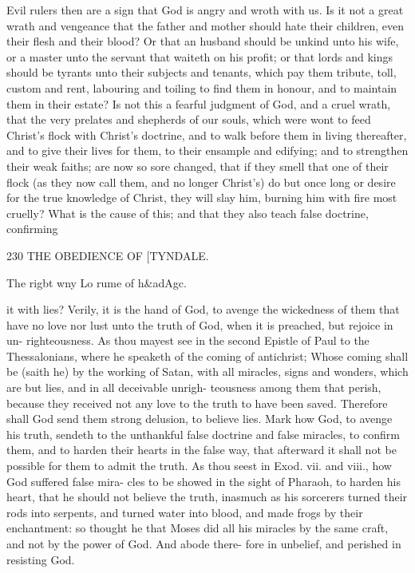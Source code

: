 \documentclass{custom}
\begin{document}
{Evil rulers then are a sign that God is angry and wroth
with us. Is it not a great wrath and vengeance that the
father and mother should hate their children, even their
flesh and their blood? Or that an husband should be 
unkind unto his wife, or a master unto the servant that 
waiteth on his profit; or that lords and kings should be 
tyrants unto their subjects and tenants, which pay them 
tribute, toll, custom and rent, labouring and toiling to 
find them in honour, and to maintain them in their estate?
Is not this a fearful judgment of God, and a cruel wrath, 
that the very prelates and shepherds of our souls, which 
were wont to feed Christ's flock with Christ's doctrine, 
and to walk before them in living thereafter, and to give 
their lives for them, to their ensample and edifying; and 
to strengthen their weak faiths; are now so sore changed, 
that if they smell that one of their flock (as they now call 
them, and no longer Christ's) do but once long or desire 
for the true knowledge of Christ, they will slay him, 
burning him with fire most cruelly? What is the cause
of this; and that they also teach false doctrine, confirming


230
THE OBEDIENCE OF
[TYNDALE.

The rigbt 
wny Lo 
rume of 
h&adAgc. 

it with lies? Verily, it is the hand of God, to avenge the 
wickedness of them that have no love nor lust unto the 
truth of God, when it is preached, but rejoice in un-
righteousness. As thou mayest see in the second Epistle 
of Paul to the Thessalonians, where he speaketh of the 
coming of antichrist; Whose coming shall be (saith he)
by the working of Satan, with all miracles, signs and 
wonders, which are but lies, and in all deceivable unrigh-
teousness among them that perish, because they received 
not any love to the truth to have been saved. Therefore 
shall God send them strong delusion, to believe lies. Mark 
how God, to avenge his truth, sendeth to the unthankful 
false doctrine and false miracles, to confirm them, and to 
harden their hearts in the false way, that afterward it shall 
not be possible for them to admit the truth. As thou
seest in Exod. vii. and viii., how God suffered false mira- 
cles to be showed in the sight of Pharaoh, to harden his 
heart, that he should not believe the truth, inasmuch as 
his sorcerers turned their rods into serpents, and turned 
water into blood, and made frogs by their enchantment:
so thought he that Moses did all his miracles by the same 
craft, and not by the power of God. And abode there- 
fore in unbelief, and perished in resisting God.

}
\end{document}
